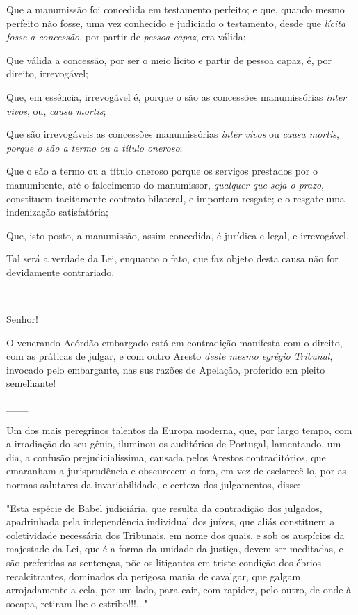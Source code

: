 Que a manumissão foi concedida em testamento perfeito; e que, quando
mesmo perfeito não fosse, uma vez conhecido e judiciado o testamento,
desde que \emph{lícita fosse a concessão}, por partir de \emph{pessoa
capaz}, era válida;

Que válida a concessão, por ser o meio lícito e partir de pessoa capaz,
é, por direito, irrevogável;

Que, em essência, irrevogável é, porque o são as concessões
manumissórias \emph{inter vivos}, ou, \emph{causa mortis};

Que são irrevogáveis as concessões manumissórias \emph{inter vivos} ou
\emph{causa mortis}, \emph{porque o são a termo ou a título oneroso};

Que o são a termo ou a título oneroso porque os serviços prestados por o
manumitente, até o falecimento do manumissor, \emph{qualquer que seja o
prazo}, constituem tacitamente contrato bilateral, e importam resgate; e
o resgate uma indenização satisfatória;

Que, isto posto, a manumissão, assim concedida, é jurídica e legal, e
irrevogável.

Tal será a verdade da Lei, enquanto o fato, que faz objeto desta causa
não for devidamente contrariado.

\_\_\_

Senhor!

O venerando Acórdão embargado está em contradição manifesta com o
direito, com as práticas de julgar, e com outro Aresto \emph{deste mesmo
egrégio Tribunal}, invocado pelo embargante, nas sus razões de Apelação,
proferido em pleito semelhante!

\_\_\_

Um dos mais peregrinos talentos da Europa moderna, que, por largo tempo,
com a irradiação do seu gênio, iluminou os auditórios de Portugal,
lamentando, um dia, a confusão prejudicialíssima, causada pelos Arestos
contraditórios, que emaranham a jurisprudência e obscurecem o foro, em
vez de esclarecê-lo, por as normas salutares da invariabilidade, e
certeza dos julgamentos, disse:

"Esta espécie de Babel judiciária, que resulta da contradição dos
julgados, apadrinhada pela independência individual dos juízes, que
aliás constituem a coletividade necessária dos Tribunais, em nome dos
quais, e sob os auspícios da majestade da Lei, que é a forma da unidade
da justiça, devem ser meditadas, e são preferidas as sentenças, põe os
litigantes em triste condição dos ébrios recalcitrantes, dominados da
perigosa mania de cavalgar, que galgam arrojadamente a cela, por um
lado, para cair, com rapidez, pelo outro, de onde à socapa, retiram-lhe
o estribo!!!..."

